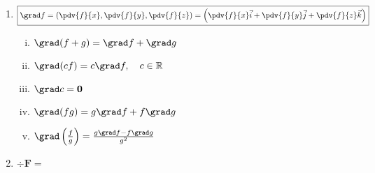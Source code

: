 



\everymath{\displaystyle}



\begin{center}
\end{center}

\vspace{\baselineskip}

\begin{enumerate}

\item $\boxed{\grad f= \left(\pdv{f}{x}, \pdv{f}{y}, 
    \pdv{f}{z}\right)=\left(\pdv{f}{x}\vec{i}+\pdv{f}{y}\vec{j}+\pdv{f}{z}\vec{k}\right)}$

\begin{enumerate}[i)]

\item $\grad (f+g)= \grad f+\grad g$
\item $\grad (cf)=c\grad f,\quad c\in \mathbb{R}$
\item $\grad c = \boldsymbol{0}$
\item $\grad (fg)=g\grad f + f\grad g$
\item $\grad\left(\frac{f}{g}\right)=\frac{g\grad f-f\grad g}{g^2}$



\end{enumerate}

\item $\boxed{\div \boldsymbol{F}}=$

\end{enumerate}


